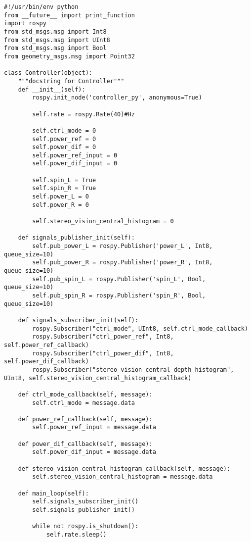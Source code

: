 \lstset{language=python}
\begin{lstlisting}
#!/usr/bin/env python
from __future__ import print_function
import rospy
from std_msgs.msg import Int8
from std_msgs.msg import UInt8
from std_msgs.msg import Bool
from geometry_msgs.msg import Point32

class Controller(object):
    """docstring for Controller"""
    def __init__(self):
        rospy.init_node('controller_py', anonymous=True)

        self.rate = rospy.Rate(40)#Hz

        self.ctrl_mode = 0
        self.power_ref = 0
        self.power_dif = 0
        self.power_ref_input = 0
        self.power_dif_input = 0 

        self.spin_L = True
        self.spin_R = True         
        self.power_L = 0
        self.power_R = 0

        self.stereo_vision_central_histogram = 0

    def signals_publisher_init(self):
        self.pub_power_L = rospy.Publisher('power_L', Int8, queue_size=10)
        self.pub_power_R = rospy.Publisher('power_R', Int8, queue_size=10)
        self.pub_spin_L = rospy.Publisher('spin_L', Bool, queue_size=10)
        self.pub_spin_R = rospy.Publisher('spin_R', Bool, queue_size=10)

    def signals_subscriber_init(self):
        rospy.Subscriber("ctrl_mode", UInt8, self.ctrl_mode_callback)
        rospy.Subscriber("ctrl_power_ref", Int8, self.power_ref_callback)
        rospy.Subscriber("ctrl_power_dif", Int8, self.power_dif_callback)  
        rospy.Subscriber("stereo_vision_central_depth_histogram", UInt8, self.stereo_vision_central_histogram_callback) 

    def ctrl_mode_callback(self, message):
        self.ctrl_mode = message.data

    def power_ref_callback(self, message):
        self.power_ref_input = message.data

    def power_dif_callback(self, message):
        self.power_dif_input = message.data

    def stereo_vision_central_histogram_callback(self, message):
        self.stereo_vision_central_histogram = message.data

    def main_loop(self):
        self.signals_subscriber_init()
        self.signals_publisher_init()
        
        while not rospy.is_shutdown():
            self.rate.sleep() 
            

\end{lstlisting}
